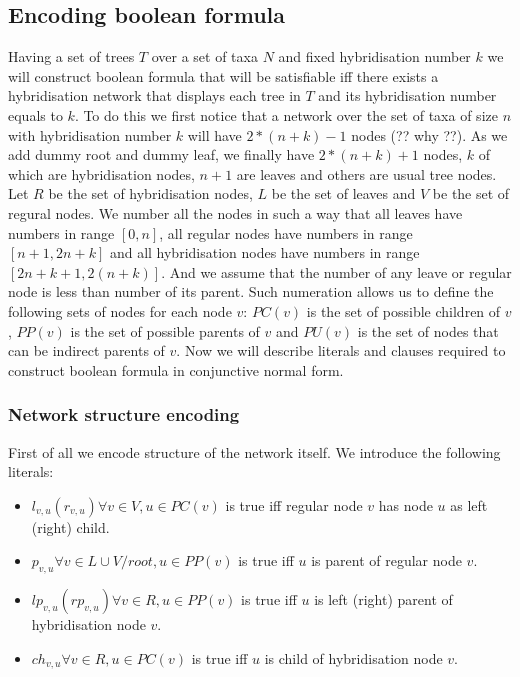 \documentclass[runningheads, envcountsame, a4paper]{llncs}
\begin{document}
\subsection{Encoding boolean formula}

Having a set of trees $T$ over a set of taxa $N$ and fixed hybridisation number $k$ we will construct boolean formula that will be satisfiable iff there exists a hybridisation network that displays each tree in $T$ and its hybridisation number equals to $k$. To do this we first notice that a network over the set of taxa of size $n$ with hybridisation number $k$ will have $2 * (n + k) - 1$ nodes (?? why ??). As we add dummy root and dummy leaf, we finally have $2 * (n + k) + 1$ nodes, $k$ of which are hybridisation nodes, $n + 1$ are leaves and others are usual tree nodes. Let $R$ be the set of hybridisation nodes, $L$ be the set of leaves and $V$ be the set of regural nodes. We number all the nodes in such a way that all leaves have numbers in range $[0,n]$, all regular nodes have numbers in range $[n + 1,2n + k]$ and all hybridisation nodes have numbers in range $[2n + k + 1, 2(n + k)]$. And we assume that the number of any leave or regular node is less than number of its parent. Such numeration allows us to define the following sets of nodes for each node $v$: $PC(v)$ is the set of possible children of $v$, $PP(v)$ is the set of possible parents of $v$ and $PU(v)$ is the set of nodes that can be indirect parents of $v$. Now we will describe literals and clauses required to construct boolean formula in conjunctive normal form.

\subsubsection{Network structure encoding}

First of all we encode structure of the network itself. We introduce the following literals: 

\begin{itemize}

\item $l_{v,u}(r_{v,u}) \forall v \in V, u \in PC(v)$ is true iff regular node $v$ has node $u$ as left (right) child.

\item $p_{v,u} \forall v \in L \cup V / root, u \in PP(v)$ is true iff $u$ is parent of regular node $v$.

\item $lp_{v,u}(rp_{v,u}) \forall v \in R, u \in PP(v)$ is true iff $u$ is left (right) parent of hybridisation node $v$.

\item $ch_{v,u} \forall v \in R, u \in PC(v)$ is true iff $u$ is child of hybridisation node $v$.

\end{itemize}
\end{document}
